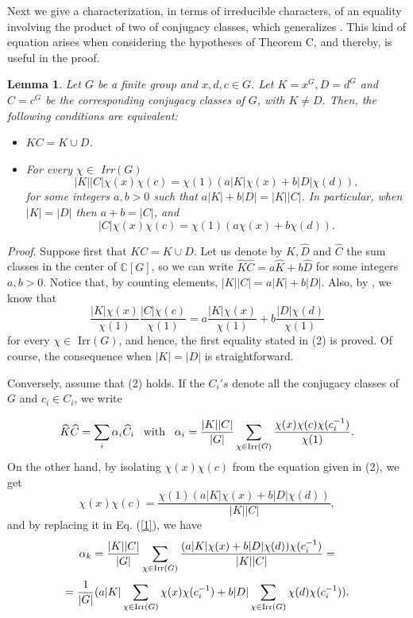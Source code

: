 \documentclass[12pt,leqno,a4paper]{amsart}
\newtheorem{lemma}[theorem]{Lemma}
\numberwithin{equation}{section}
\begin{document}
Next we give a characterization, in terms of irreducible characters, of an equality involving the product of two of conjugacy classes, which generalizes \cite[Lemma 3.1]{B}. This kind of equation arises when considering the hypotheses of Theorem C, and thereby, is useful in the proof.

\begin{lemma} \label{31} {\it Let $G$ be a finite group and $x, d, c\in G$. Let $K=x^G, D=d^G$ and $C
=c^G$ be the corresponding conjugacy classes of $G$, with $K\neq D$. Then, the following conditions are equivalent:}
\begin{itemize}
\item[(1)] $KC= K \cup D$.
\item[(2)] For every $\chi \in$ {\rm Irr}$(G)$ $$|K||C|\chi(x)\chi(c)=\chi(1)(a|K| \chi(x)+b|D|\chi(d)),$$
for some integers $a,b> 0$ such that $a|K|+b|D|=|K||C|$.
In particular, when $|K|=|D|$ then $a+b=|C|$, and
$$|C|\chi(x)\chi(c)=\chi(1)(a \chi(x)+b\chi(d)).$$
\end{itemize}
\end{lemma}


{\it Proof}. Suppose  first that $KC= K\cup D$.  Let  us denote by $\widehat{K},\widehat{D}$ and $\widehat{C}$  the sum classes in the center of  ${\mathbb C}[G]$, so we can  write $\widehat{K}\widehat{C}=a\widehat{K}+b\widehat{D}$ for some integers $a,b> 0$. Notice that, by counting elements, $|K||C|= a|K|+ b|D|$. Also, by  \cite[Lemma 3.8 and Theorem 3.9]{Huppert}, we know that
$$\frac{|K|\chi(x)}{\chi(1)} \frac{|C|\chi(c)}{\chi(1)}= a \frac{|K|\chi(x)}{\chi(1)}+b\frac{|D|\chi(d)}{\chi(1)}$$
 for every $\chi \in$ Irr$(G)$, and hence,  the first equality  stated in (2)  is proved. Of course, the consequence when $|K|=|D|$ is straightforward.

\medskip
Conversely, assume that (2) holds. If the $C_i's$ denote all the conjugacy classes of $G$ and $c_i\in C_i$, we write

\begin{equation}\label{1}
\widehat{K}\widehat{C}=\sum_{i}\alpha_{i}\widehat{C}_{i} \, \, \, \, \, {\rm with} \, \, \, \, \, \alpha_{i}=\frac{|K||C|}{|G|}\sum_{\chi\in {\rm Irr}(G)}\frac{\chi(x)\chi(c)\chi(c_{i}^{-1})}{\chi(1)}.
 \end{equation}
 On the other hand, by isolating $\chi(x)\chi(c)$ from the equation given in (2), we get
 $$
 \chi(x)\chi(c)=\frac{\chi(1)(a|K|\chi(x)+b|D|\chi(d))}{|K||C|},
 $$
  and by replacing it in Eq. (\ref{1}), we have
  $$
 \alpha_{k}=\frac{|K||C|}{|G|}\sum_{\chi\in {\rm Irr}(G)} \frac{(a|K|\chi(x)+b|D|\chi(d))\chi(c_i^{-1})}{|K||C|}=$$
$$ =\frac{1}{|G|}(a |K| \sum_{\chi\in {\rm Irr}(G)} \chi(x)\chi(c_i^{-1})+b |D| \sum_{\chi\in {\rm Irr}(G)} \chi(d)\chi(c_i^{-1})).
$$
\end{document}
